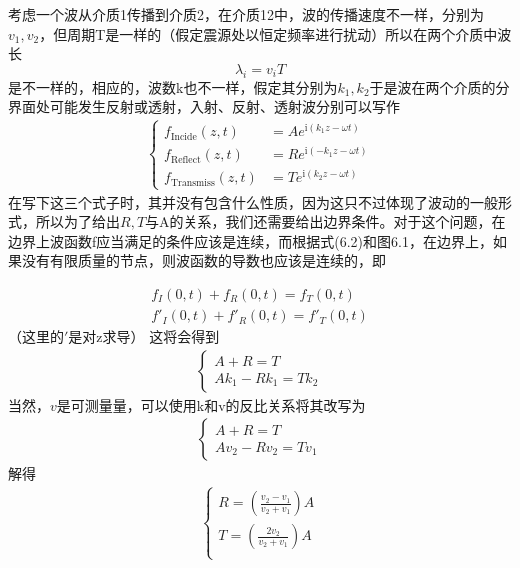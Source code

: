 \documentclass[14pt,oneside]{book}
\def \i{\mathrm{i}}
\begin{document}
\begin{large}
考虑一个波从介质1传播到介质2，在介质12中，波的传播速度不一样，分别为$v_1,v_2$，但周期T是一样的（假定震源处以恒定频率进行扰动）所以在两个介质中波长
\begin{equation}
  \lambda_i=v_iT
\end{equation}
是不一样的，相应的，波数k也不一样，假定其分别为$k_1,k_2$于是波在两个介质的分界面处可能发生反射或透射，入射、反射、透射波分别可以写作
\begin{equation}
  \begin{aligned}
  \begin{cases}
  		  f_{\mathrm{Incide}}(z,t)&=A e^{\i ( k_1z-\omega t) }\\
  		  f_{\mathrm{Reflect}}(z,t)&= R e^{\i (-k_1 z - \omega t)}\\
  		  f_{\mathrm{Transmiss}}(z,t)&= T e^{\i (k_2 z - \omega t)}
  \end{cases}
\end{aligned}
\end{equation}
在写下这三个式子时，其并没有包含什么性质，因为这只不过体现了波动的一般形式，所以为了给出$R,T$与A的关系，我们还需要给出边界条件。对于这个问题，在边界上波函数f应当满足的条件应该是连续，而根据式(6.2)和图6.1，在边界上，如果没有有限质量的节点，则波函数的导数也应该是连续的，即

  \begin{align}
	  f_I(0,t)+f_R(0,t)=f_T(0,t)	\\
	  f'_I(0,t)+f'_R(0,t)=f'_T(0,t)
\end{align}
（这里的$'$是对z求导）
这将会得到
\begin{align}
\begin{cases}
	A+R=T\\
	Ak_1-Rk_1=Tk_2
\end{cases}
\end{align}
当然，$v$是可测量量，可以使用k和v的反比关系将其改写为
\begin{align}
\begin{cases}
	A+R=T\\
	Av_2-Rv_2=Tv_1
\end{cases}
\end{align}
解得
\begin{align}
\begin{cases}
	R=\left(\frac{v_2-v_1}{v_2+v_1}\right) A\\
	T=\left(\frac{2 v_2}{v_2+v_1}\right) A\\
\end{cases}
\end{align}



\end{large}
\end{document}
